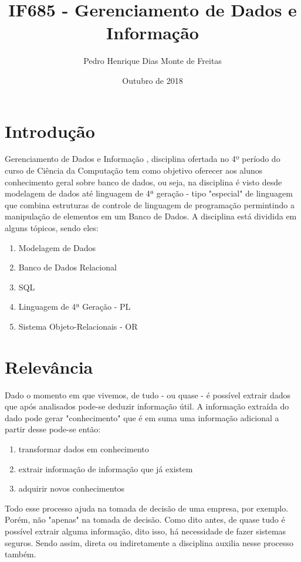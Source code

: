 \documentclass{article}
\title{IF685 - Gerenciamento de Dados e Informação}
\author{Pedro Henrique Dias Monte de Freitas}
\date{Outubro de 2018}
\begin{document}
\maketitle

\section{Introdução}
Gerenciamento de Dados e Informação \cite{site}, disciplina ofertada no 4º período do curso de Ciência da Computação tem como objetivo oferecer aos alunos conhecimento geral sobre banco de dados, ou seja, na disciplina é visto desde modelagem de dados até linguagem de 4ª geração - tipo "especial" de linguagem que combina estruturas de controle de linguagem de programação permintindo a manipulação de elementos em um Banco de Dados. A disciplina está dividida em alguns tópicos, sendo eles:

\begin{enumerate}
    \item Modelagem de Dados \cite{navathe}
    \item Banco de Dados Relacional
    \item SQL \citep{navathe}
    \item Linguagem de 4ª Geração - PL
    \item Sistema Objeto-Relacionais - OR
\end{enumerate}

\section{Relevância}
Dado o momento em que vivemos, de tudo - ou quase - é possível extrair dados que após analisados pode-se deduzir informação útil. A informação extraída do dado pode gerar "conhecimento" que é em suma uma informação adicional a partir desse pode-se então:
\begin{enumerate}
    \item transformar dados em conhecimento
    \item extrair informação de informação que já existem
    \item adquirir novos conhecimentos
\end{enumerate}

Todo esse processo ajuda na tomada de decisão de uma empresa, por exemplo. Porém, não "apenas" na tomada de decisão. Como dito antes, de quase tudo é possível extrair alguma informação, dito isso, há necessidade de fazer sistemas seguros\cite{laudon}. Sendo assim, direta ou indiretamente a disciplina auxilia nesse processo também. 
\end{document}
